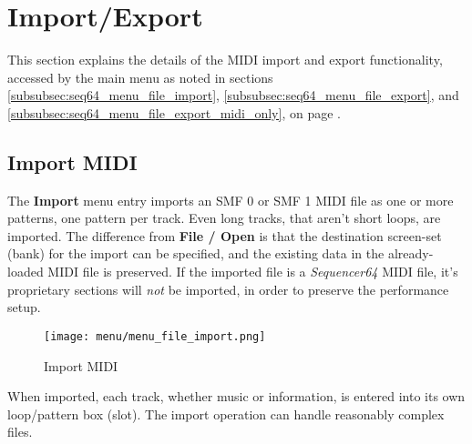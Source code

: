 %
%
%

\section{Import/Export}
\label{sec:seq64_midi_export}

   This section explains the details of the MIDI import and export
   functionality, accessed by the main menu as noted in
   sections
   \ref{subsubsec:seq64_menu_file_import},
   \ref{subsubsec:seq64_menu_file_export}, and
   \ref{subsubsec:seq64_menu_file_export_midi_only}, on page
   \pageref{subsubsec:seq64_menu_file_import}.


\subsection{Import MIDI}
\label{subsec:seq64_midi_export_file_import}

   The \textbf{Import} menu entry imports an SMF 0
   or SMF 1 MIDI file as one or more patterns, one pattern per track.
   Even long tracks, that aren't short loops, are imported.
   The difference from \textbf{File / Open} is that the destination screen-set
   (bank) for the import can be specified, and the existing data in the
   already-loaded MIDI file is preserved.
   If the imported file is a
   \textsl{Sequencer64} MIDI file, it's proprietary sections will
   \textsl{not} be imported, in order to preserve the performance setup.

\begin{figure}[H]
   \centering 
   \texttt{[image: menu/menu\_file\_import.png]}
   \caption{Import MIDI}
   \label{fig:seq64_midi_export_file_import}
\end{figure}

   When imported, each track, whether music or information,
   is entered into its own loop/pattern box (slot).
   The import operation can handle reasonably complex files.

